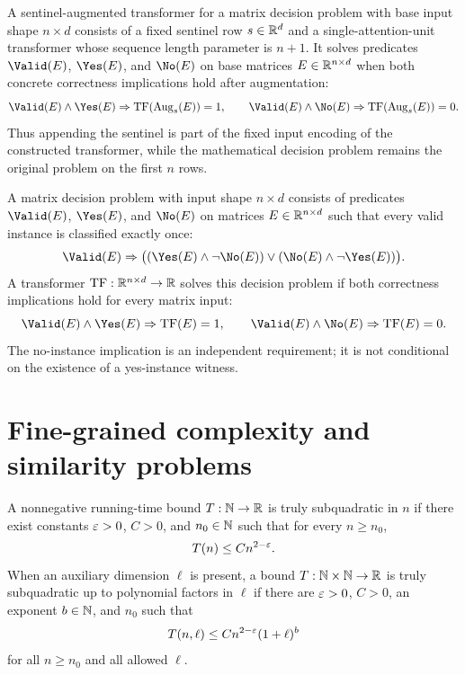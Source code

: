 \begin{definition}
  \label{def:sentinel-transformer-solves}
  A sentinel-augmented transformer for a matrix decision problem with base
  input shape $n\times d$ consists of a fixed sentinel row $s\in\mathbb{R}^d$ and a
  single-attention-unit transformer whose sequence length parameter is
  $n+1$.  It solves predicates $\Valid(E)$, $\Yes(E)$, and $\No(E)$ on base
  matrices $E\in\mathbb{R}^{n\times d}$ when both concrete correctness implications
  hold after augmentation:
  \[
    \Valid(E)\wedge\Yes(E)\Rightarrow {\rm TF}(\Aug_s(E))=1,
    \qquad
    \Valid(E)\wedge\No(E)\Rightarrow {\rm TF}(\Aug_s(E))=0.
  \]
  Thus appending the sentinel is part of the fixed input encoding of the
  constructed transformer, while the mathematical decision problem remains the
  original problem on the first $n$ rows.
\end{definition}

\begin{definition}
  \label{def:transformer-solves}
  A matrix decision problem with input shape $n\times d$ consists of predicates
  $\Valid(E)$, $\Yes(E)$, and $\No(E)$ on matrices $E\in\mathbb{R}^{n\times d}$ such
  that every valid instance is classified exactly once:
  \[
    \Valid(E)\Rightarrow
    \bigl((\Yes(E)\wedge\neg\No(E))\vee(\No(E)\wedge\neg\Yes(E))\bigr).
  \]
  A transformer ${\rm TF}:\mathbb{R}^{n\times d}\to\mathbb{R}$ solves this decision problem if
  both correctness implications hold for every matrix input:
  \[
    \Valid(E)\wedge\Yes(E)\Rightarrow {\rm TF}(E)=1,
    \qquad
    \Valid(E)\wedge\No(E)\Rightarrow {\rm TF}(E)=0.
  \]
  The no-instance implication is an independent requirement; it is not
  conditional on the existence of a yes-instance witness.
\end{definition}

\chapter{Fine-grained complexity and similarity problems}

\begin{definition}
  \label{def:truly-subquadratic}
  A nonnegative running-time bound $T:\mathbb{N}\to\mathbb{R}$ is truly subquadratic in $n$ if
  there exist constants $\varepsilon>0$, $C>0$, and $n_0\in\mathbb{N}$ such that for every
  $n\geq n_0$,
  \[
    T(n)\leq C n^{2-\varepsilon}.
  \]
  When an auxiliary dimension $\ell$ is present, a bound
  $T:\mathbb{N}\times\mathbb{N}\to\mathbb{R}$ is truly subquadratic up to polynomial factors in $\ell$
  if there are $\varepsilon>0$, $C>0$, an exponent $b\in\mathbb{N}$, and $n_0$ such that
  \[
    T(n,\ell)\leq C n^{2-\varepsilon}(1+\ell)^b
  \]
  for all $n\geq n_0$ and all allowed $\ell$.
\end{definition}

